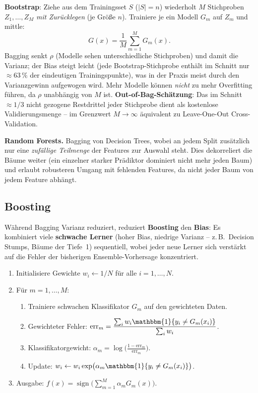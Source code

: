 \documentclass[11pt]{article}
\theoremstyle{csthm}
\theoremstyle{csdef}
\newcommand{\I}{\mathbbm{1}}
\begin{document}
\textbf{Bootstrap}: Ziehe aus dem Trainingsset $S$ ($|S|=n$) wiederholt $M$
Stichproben $Z_1,\ldots,Z_M$ \emph{mit Zurücklegen} (je Größe $n$). Trainiere
je ein Modell $G_m$ auf $Z_m$ und mittle:
\begin{equation}
  G(x) = \frac{1}{M}\sum_{m=1}^M G_m(x).
\end{equation}
Bagging senkt $\rho$ (Modelle sehen unterschiedliche Stichproben) und damit
die Varianz; der Bias steigt leicht (jede Bootstrap-Stichprobe enthält im
Schnitt nur $\approx 63\,\%$ der eindeutigen Trainingspunkte), was in der
Praxis meist durch den Varianzgewinn aufgewogen wird. Mehr Modelle können
\emph{nicht} zu mehr Overfitting führen, da $\rho$ unabhängig von $M$ ist.
\textbf{Out-of-Bag-Schätzung}: Das im Schnitt $\approx 1/3$ nicht gezogene
Restdrittel jeder Stichprobe dient als kostenlose Validierungsmenge -- im
Grenzwert $M\to\infty$ äquivalent zu Leave-One-Out Cross-Validation.

\begin{tcolorbox}[defstyle]
\textbf{Random Forests.} Bagging von Decision Trees, wobei an jedem Split
zusätzlich nur eine \emph{zufällige Teilmenge} der Features zur Auswahl
steht. Dies dekorreliert die Bäume weiter (ein einzelner starker Prädiktor
dominiert nicht mehr jeden Baum) und erlaubt robusteren Umgang mit fehlenden
Features, da nicht jeder Baum von jedem Feature abhängt.
\end{tcolorbox}

\subsection{Boosting}

Während Bagging Varianz reduziert, reduziert \textbf{Boosting} den
\textbf{Bias}: Es kombiniert viele \textbf{schwache Lerner} (hoher Bias,
niedrige Varianz -- z.\,B.\ Decision Stumps, Bäume der Tiefe~1) sequentiell,
wobei jeder neue Lerner sich verstärkt auf die Fehler der bisherigen
Ensemble-Vorhersage konzentriert.

\begin{tcolorbox}[algostyle, title={AdaBoost}]
\begin{enumerate}[leftmargin=*, itemsep=2pt]
  \item Initialisiere Gewichte $w_i \leftarrow 1/N$ für alle $i=1,\ldots,N$.
  \item Für $m = 1,\ldots,M$:
  \begin{enumerate}[label=(\alph*)]
    \item Trainiere schwachen Klassifikator $G_m$ auf den gewichteten Daten.
    \item Gewichteter Fehler: $\text{err}_m = \dfrac{\sum_i w_i \I\{y_i \neq G_m(x_i)\}}{\sum_i w_i}$.
    \item Klassifikatorgewicht: $\alpha_m = \log\!\bigl(\tfrac{1-\text{err}_m}{\text{err}_m}\bigr)$.
    \item Update: $w_i \leftarrow w_i \exp\bigl(\alpha_m \I\{y_i\neq G_m(x_i)\}\bigr)$.
  \end{enumerate}
  \item Ausgabe: $f(x) = \operatorname{sign}\bigl(\sum_{m=1}^M \alpha_m G_m(x)\bigr)$.
\end{enumerate}
\end{tcolorbox}
\end{document}

